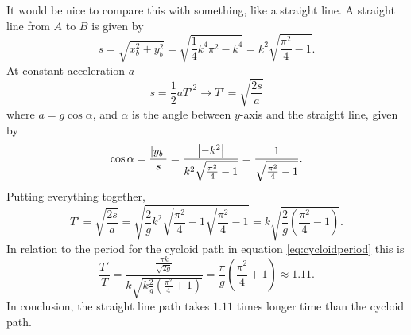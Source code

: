 \documentclass[11pt]{amsart}
\begin{document}
It would be nice to compare this with something, like a straight line. A straight line from $A$ to $B$ is given by
\begin{equation}
s = \sqrt{x_b^2+y_b^2}=\sqrt{\frac{1}{4}k^4\pi^2-k^4} = k^2\sqrt{\frac{\pi^2}{4}-1}.
\end{equation}
At constant acceleration $a$
\begin{equation*}
s = \frac{1}{2}aT'^2 \rightarrow T' = \sqrt{\frac{2s}{a}}
\end{equation*}
where $a = g\cos\alpha$, and $\alpha$ is the angle between $y$-axis and  the straight line, given by 
\begin{equation*}
\cos\alpha = \frac{\abs{y_b}}{s} = \frac{\abs{-k^2}}{k^2\sqrt{\frac{\pi^2}{4}-1}}=\frac{1}{\sqrt{\frac{\pi^2}{4}-1}}.
\end{equation*}
Putting everything together,
\begin{equation}
T' = \sqrt{\frac{2s}{a}} = \sqrt{\frac{2}{g}k^2\sqrt{\frac{\pi^2}{4}-1}\sqrt{\frac{\pi^2}{4}-1}} =k\sqrt{\frac{2}{g}\left(\frac{\pi^2}{4}-1 \right)}.
\end{equation}
In relation to the period for the cycloid path in equation \ref{eq:cycloidperiod} this is
\begin{equation}
\frac{T'}{T} = \frac{\frac{\pi k}{\sqrt{2g}}}{k\sqrt{k\frac{2}{g}\left(\frac{\pi^2}{4} +1\right)}} = \frac{\pi}{g}\left(\frac{\pi^2}{4} +1\right) \approx 1.11.
\end{equation}
In conclusion, the straight line path takes $1.11$ times longer time than the cycloid path.
\end{document}
